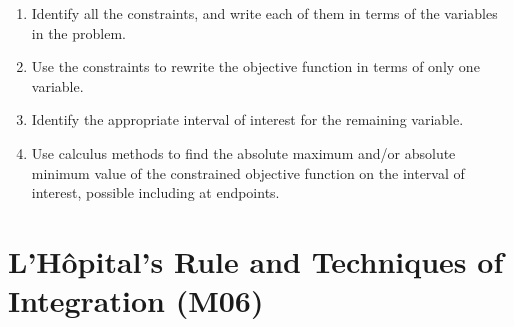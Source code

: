 \documentclass{article}
\begin{document}
\begin{itemize}
\begin{enumerate}
        \item Identify all the constraints, and write each of them in terms of the variables in the problem. \\
        \item Use the constraints to rewrite the objective function in terms of only one variable.
        \item Identify the appropriate interval of interest for the remaining variable.
        \item Use calculus methods to find the absolute maximum and/or absolute minimum value of the constrained objective function on the interval of interest, possible including at endpoints.
    \end{enumerate}
\end{itemize}

\section*{L'Hôpital's Rule and Techniques of Integration (M06)}
\end{document}
